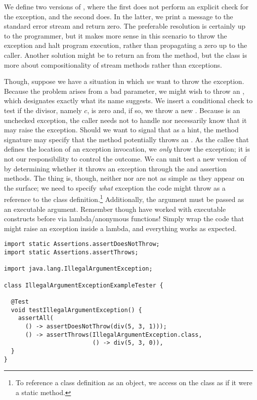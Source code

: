 We define two versions of , where the first does not perform an explicit check for the exception, and the second does. 
In the latter, we print a message to the standard error stream and return zero. 
The preferable resolution is certainly up to the programmer, but it makes more sense in this scenario to throw the exception and halt program execution, rather than propagating a zero up to the caller. 
Another solution might be to return an  from the method, but the  class is more about compositionality of stream methods rather than exceptions.

Though, suppose we have a situation in which \emph{we} want to throw the exception. 
Because the  problem arises from a bad parameter, we might wish to throw an , which designates exactly what its name suggests. 
We insert a conditional check to test if the divisor, namely $c$, is zero and, if so, we throw a new . 
Because  is an unchecked exception, the caller needs not to handle nor necessarily know that it may raise the exception. 
Should we want to signal that as a hint, the method signature may specify that the method potentially throws an . 
As the callee that defines the location of an exception invocation, we \emph{only} throw the exception; it is not our responsibility to control the outcome. 
We can unit test a new version of  by determining whether it throws an exception through the  and  assertion methods. 
The thing is, though, neither  nor  are not as simple as they appear on the surface; we need to specify \emph{what} exception the code might throw as a reference to the class definition.\footnote{To reference a class definition as an object, we access  on the class as if it were a static method.} 
Additionally, the argument must be passed as an executable argument. 
Remember though have worked with executable constructs before via lambda/anonymous functions! 
Simply wrap the code that might raise an exception inside a lambda, and everything works as expected.

\begin{lstlisting}[language=MyJava]
import static Assertions.assertDoesNotThrow;
import static Assertions.assertThrows;

import java.lang.IllegalArgumentException;

class IllegalArgumentExceptionExampleTester {
  
  @Test
  void testIllegalArgumentException() {
    assertAll(
      () -> assertDoesNotThrow(div(5, 3, 1)));
      () -> assertThrows(IllegalArgumentException.class, 
                         () -> div(5, 3, 0)),
  }
}
\end{lstlisting}

